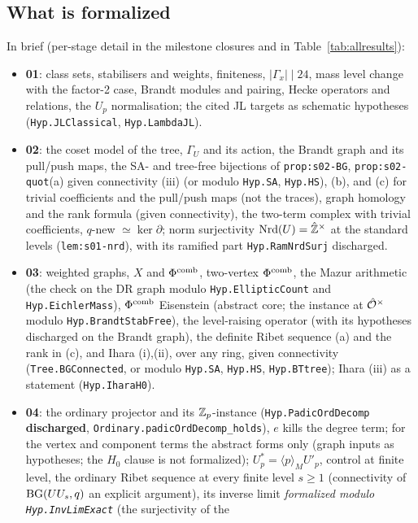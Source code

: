 \subsection{What is formalized}
In brief (per-stage detail in the milestone closures and in Table~\ref{tab:allresults}):
\begin{itemize}
\item \textbf{01}: class sets, stabilisers and weights, finiteness, $|\Gamma_x|\mid 24$, mass level change with the factor-2
  case, Brandt modules and pairing, Hecke operators and relations, the $U_p$ normalisation; the cited JL targets as
  schematic hypotheses (\texttt{Hyp.JLClassical}, \texttt{Hyp.LambdaJL}).
\item \textbf{02}: the coset model of the tree, $\Gamma_U$ and its action, the Brandt graph and its pull/push maps, the
  SA- and tree-free bijections of \texttt{prop:s02-BG}, \texttt{prop:s02-quot}(a) given connectivity (iii) (or modulo
  \texttt{Hyp.SA}, \texttt{Hyp.HS}), (b), and (c) for trivial coefficients and the pull/push maps (not the traces), graph
  homology and the rank formula (given connectivity),
  the two-term complex with trivial coefficients, $q$-new $\simeq\ker\partial$; norm surjectivity $\mathrm{Nrd}(U)=\hat{\mathbb{Z}}^\times$ at the
  standard levels (\texttt{lem:s01-nrd}), with its ramified part \texttt{Hyp.RamNrdSurj} discharged.
\item \textbf{03}: weighted graphs, $X$ and $\Phi^{\mathrm{comb}}$, two-vertex $\Phi^{\mathrm{comb}}$, the Mazur arithmetic (the check on the DR graph modulo \texttt{Hyp.EllipticCount} and \texttt{Hyp.EichlerMass}),
  $\Phi^{\mathrm{comb}}$ Eisenstein (abstract core; the instance at $\hat{\mathcal{O}}^\times$ modulo \texttt{Hyp.BrandtStabFree}),
  the level-raising operator (with its hypotheses discharged on the Brandt graph), the definite Ribet sequence (a) and
  the rank in (c), and Ihara (i),(ii), over any ring, given connectivity (\texttt{Tree.BGConnected}, or modulo \texttt{Hyp.SA},
  \texttt{Hyp.HS}, \texttt{Hyp.BTtree}); Ihara (iii) as a statement (\texttt{Hyp.IharaH0}).
\item \textbf{04}: the ordinary projector and its $\mathbb{Z}_p$-instance (\texttt{Hyp.PadicOrdDecomp} \textbf{discharged},
  \texttt{Ordinary.padicOrdDecomp\_holds}), $e$ kills the degree term; for the vertex and component terms the abstract forms only (graph inputs as hypotheses; the
  $H_0$ clause is not formalized); $U_p^*=\langle p\rangle_M U'_p$,
  control at finite level, the ordinary Ribet sequence at every finite level $s\ge1$ (connectivity of $\mathrm{BG}(UU_s,q)$ an
  explicit argument), its inverse limit \emph{formalized modulo \texttt{Hyp.InvLimExact}} (the surjectivity of the

\end{itemize}
